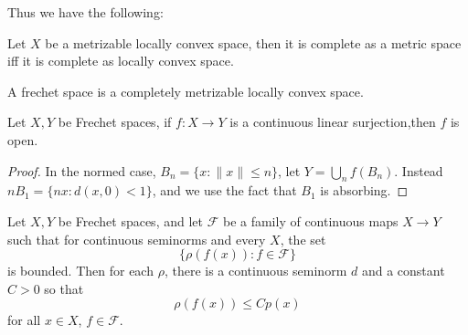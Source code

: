 \documentclass[openany]{book}
\begin{document}
Thus we have the following:
\begin{prop}
    Let $X$ be a metrizable locally convex space, then it is complete as a metric space iff it is complete as locally convex space.
\end{prop}

\begin{defn}
    A frechet space is a completely metrizable locally convex space.
\end{defn}


\begin{prop}
    Let $X,Y$ be Frechet spaces, if $f:X\to Y$ is a continuous linear surjection,then $f$ is open.
\end{prop}
\begin{proof}
    In the normed case, $B_n=\{x: \|x\|\leq n\}$, let $Y=\bigcup_n f(B_n)$. Instead $nB_1=\{nx: d(x,0)<1\}$, and we use the fact that $B_1$ is absorbing.
\end{proof}

\begin{prop}[UBP]
    Let $X,Y$ be Frechet spaces, and let $\mathcal{F}$ be a family of continuous maps $X\to Y$ such that for continuous seminorms and every $X$, the set 
    \begin{equation*}
        \{\rho(f(x)): f\in\mathcal{F}\}
    \end{equation*}
    is bounded. Then for each $\rho$, there is a continuous seminorm $d$ and a constant $C>0$ so that 
    \begin{equation*}
        \rho(f(x))\leq Cp(x)
    \end{equation*}
    for all $x\in X$, $f\in\mathcal{F}$.
\end{prop}

\end{document}
